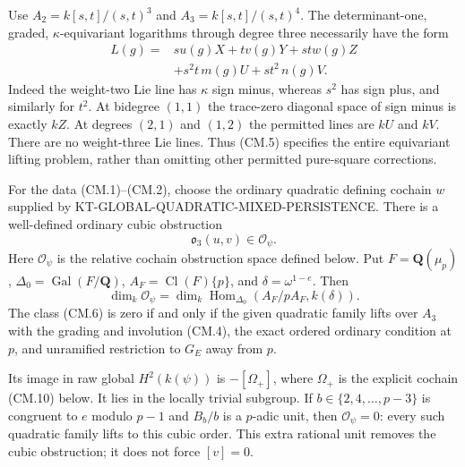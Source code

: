 Use $A_2=k[s,t]/(s,t)^3$ and $A_3=k[s,t]/(s,t)^4$.
The determinant-one, graded, $\kappa$-equivariant logarithms
through degree three necessarily have the form
\[
\begin{split}
 L(g)={}&s u(g)X+t v(g)Y+st w(g)Z\\
        &+s^2t\,m(g)U+st^2\,n(g)V.
\end{split}                                                   \tag{CM.5}
\]
Indeed the weight-two Lie line has $\kappa$ sign minus,
whereas $s^2$ has sign plus, and similarly for $t^2$.
At bidegree $(1,1)$ the trace-zero diagonal space of sign minus
is exactly $kZ$.  At degrees $(2,1)$ and $(1,2)$ the permitted
lines are $kU$ and $kV$.  There are no weight-three Lie lines.
Thus (CM.5) specifies the entire equivariant lifting problem,
rather than omitting other permitted pure-square corrections.

\begin{theorem}
For the data (CM.1)--(CM.2), choose the ordinary quadratic
defining cochain $w$ supplied by
KT-GLOBAL-QUADRATIC-MIXED-PERSISTENCE.  There is a well-defined
ordinary cubic obstruction
\[
                  \mathfrak o_3(u,v)\in\mathcal O_\psi.          \tag{CM.6}
\]
Here $\mathcal O_\psi$ is the relative cochain obstruction space
defined below.  Put $F=\mathbf Q(\mu_p)$,
$\Delta_0=\operatorname{Gal}(F/\mathbf Q)$,
$A_F=\operatorname{Cl}(F)\{p\}$, and $\delta=\omega^{1-e}$.
Then
\[
 \dim_k\mathcal O_\psi
   =\dim_k\operatorname{Hom}_{\Delta_0}
                         (A_F/pA_F,k(\delta)).                 \tag{CM.7}
\]
The class (CM.6) is zero if and only if the given quadratic
family lifts over $A_3$ with the grading and involution
(CM.4), the exact ordered ordinary condition at $p$, and
unramified restriction to $G_E$ away from $p$.

Its image in raw global $H^2(k(\psi))$ is
$-[\Omega_+]$, where $\Omega_+$ is the explicit cochain
(CM.10) below.  It lies in the locally trivial subgroup.
If $b\in\{2,4,\ldots,p-3\}$ is congruent to $e$ modulo $p-1$
and $B_b/b$ is a $p$-adic unit, then
$\mathcal O_\psi=0$: every such quadratic family lifts to
this cubic order.  This extra rational unit removes the cubic
obstruction; it does not force $[v]=0$.
\end{theorem}


